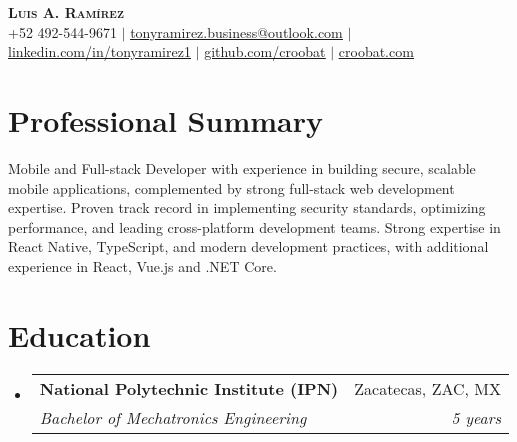 \documentclass[letterpaper,11pt]{article}
\makeatletter
\newcommand{\resumeSubheading}[4]{
  \vspace{4pt}\item
    \begin{tabular*}{0.97\textwidth}[t]{l@{\extracolsep{\fill}}r}
      \textbf{#1} & #2 \\
      \textit{\small#3} & \textit{\small #4} \\
    \end{tabular*}\vspace{-2pt}
}
\newcommand{\resumeSubHeadingListStart}{\begin{itemize}[leftmargin=0.15in, label={}]}
\newcommand{\resumeSubHeadingListEnd}{\end{itemize}}
\makeatother
\begin{document}
\begin{center}
    \textbf{\Huge \scshape Luis A. Ramírez} \\ \vspace{1pt}
    \small +52 492-544-9671 $|$ \href{tonyramirez.business@outlook.com}{\underline{tonyramirez.business@outlook.com}} $|$
    \href{https://linkedin.com/in/tonyramirez1}{\underline{linkedin.com/in/tonyramirez1}} $|$
    \href{https://github.com/croobat}{\underline{github.com/croobat}} $|$
    \href{https://croobat.com}{\underline{croobat.com}}
\end{center}

\section{Professional Summary}
\begin{itemize}[leftmargin=0.15in, label={}]
\small{
\item{Mobile and Full-stack Developer with experience in building secure, scalable mobile applications, complemented by strong full-stack web development expertise. Proven track record in implementing security standards, optimizing performance, and leading cross-platform development teams. Strong expertise in React Native, TypeScript, and modern development practices, with additional experience in React, Vue.js and .NET Core.}
}
\end{itemize}

\section{Education}
  \resumeSubHeadingListStart
    \resumeSubheading
      {National Polytechnic Institute (IPN)} {Zacatecas, ZAC, MX}
      {Bachelor of Mechatronics Engineering}{5 years}
  \resumeSubHeadingListEnd


\end{document}
